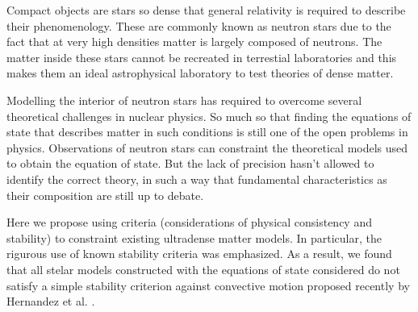 \begin{abstract1}
    \begin{spacing}{1.0}
    Compact objects are stars so dense that general relativity is required to describe their phenomenology. These are commonly known as neutron stars due to the fact that at very high densities matter is largely composed of neutrons. The matter inside these stars cannot be recreated in terrestial laboratories and this makes them an ideal astrophysical laboratory to test theories of dense matter.
    
    Modelling the interior of neutron stars has required to overcome several theoretical challenges in nuclear physics. So much so that finding the equations of state that describes matter in such conditions is still one of the open problems in physics. Observations of neutron stars can constraint the theoretical models used to obtain the equation of state. But the lack of precision hasn't allowed to identify the correct theory, in such a way that fundamental characteristics as their composition are still up to debate.
    
    Here we propose using  criteria (considerations of physical consistency and stability) to constraint existing ultradense matter models. In particular, the rigurous use of known stability criteria was emphasized. As a result, we found that all stelar models constructed with the equations of state considered do not satisfy a simple stability criterion against convective motion proposed recently by Hernandez et al. \cite{Hernandez2018}.
    \end{spacing}
\end{abstract1}